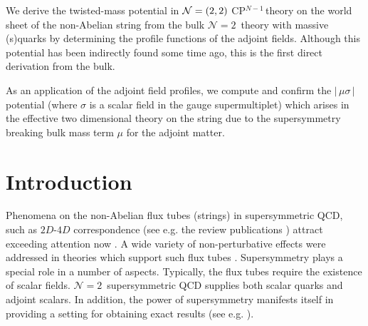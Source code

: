 \documentclass[12pt]{article}
\newcommand{\ntwo}{${\mathcal N}=2$}
\newcommand{\ntwon}{${\mathcal N}=2$}
\newcommand{\cpn}{CP$^{N-1}$\,}
\begin{document}
\begin{titlepage}
	We derive  the twisted-mass potential in $ {\cal N}=(2,2) $ \cpn theory 
	on the world sheet of the non-Abelian string from the bulk \ntwo\, theory with massive (s)quarks
	by determining the profile functions of the adjoint fields.
	Although this potential has been indirectly found some time ago, this is the first  
	direct derivation from the bulk.

	
	As an application of the adjoint field profiles, we compute and confirm the $ |\, \mu \sigma \,| $ potential (where $\sigma$ is a scalar field in the gauge supermultiplet)
	 which arises in the effective two dimensional theory on the string due to the supersymmetry breaking bulk mass term $\mu$ for the adjoint matter.

\vspace{2cm}


\end{titlepage}




\section{Introduction}
\setcounter{equation}{0}

	Phenomena on the non-Abelian flux tubes (strings)  in supersymmetric QCD, such as $2D$-$4D$ 
	correspondence (see e.g. the  review publications
	\cite{Trev,SYrev})
	attract exceeding attention now \cite{GGS}.
	A wide variety of non-perturbative effects were addressed in theories 
	which support such flux tubes
	\cite{Shifman:2010id}.
	Supersymmetry plays a special role in a number of aspects.
	Typically, the flux tubes require the existence of scalar fields. 
	\ntwon\, supersymmetric QCD supplies both scalar quarks and adjoint scalars. In addition,
	the power of supersymmetry manifests itself in providing a setting for obtaining
	 exact results (see e.g.
	\cite{Novikov:1983uc,Seiberg:1994rs,Seiberg:1994aj,Shifman:2013ewa}).
\end{document}
